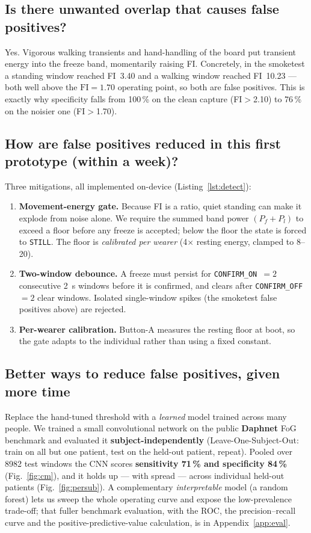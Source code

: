 \documentclass[11pt,a4paper]{article}
\begin{document}
\subsection{Is there unwanted overlap that causes false positives?}
Yes. Vigorous walking transients and hand-handling of the board put transient energy
into the freeze band, momentarily raising FI. Concretely, in the smoketest a standing
window reached FI~3.40 and a walking window reached FI~10.23 --- both well above the
$\mathrm{FI}=1.70$ operating point, so both are false positives. This is exactly why
specificity falls from 100\,\% on the clean capture (FI$>$2.10) to 76\,\% on the
noisier one (FI$>$1.70).

\subsection{How are false positives reduced in this first prototype (within a week)?}
Three mitigations, all implemented on-device (Listing~\ref{lst:detect}):
\begin{enumerate}[leftmargin=1.6em]
\item \textbf{Movement-energy gate.} Because FI is a ratio, quiet standing can make it
      explode from noise alone. We require the summed band power
      $(P_f+P_l)$ to exceed a floor before any freeze is accepted; below the floor the
      state is forced to \texttt{STILL}. The floor is \emph{calibrated per wearer}
      (4$\times$ resting energy, clamped to \numrange{8}{20}).
\item \textbf{Two-window debounce.} A freeze must persist for
      \texttt{CONFIRM\_ON}~$=2$ consecutive \SI{2}{\second} windows before it is
      confirmed, and clears after \texttt{CONFIRM\_OFF}~$=2$ clear windows. Isolated
      single-window spikes (the smoketest false positives above) are rejected.
\item \textbf{Per-wearer calibration.} Button-A measures the resting floor at boot, so
      the gate adapts to the individual rather than using a fixed constant.
\end{enumerate}

\subsection{Better ways to reduce false positives, given more time}
Replace the hand-tuned threshold with a \emph{learned} model trained across many
people. We trained a small convolutional network on the public \textbf{Daphnet} FoG
benchmark and evaluated it \textbf{subject-independently} (Leave-One-Subject-Out:
train on all but one patient, test on the held-out patient, repeat). Pooled over
\num{8982} test windows the CNN scores \textbf{sensitivity 71\,\% and specificity
84\,\%} (Fig.~\ref{fig:cm}), and it holds up --- with spread --- across individual
held-out patients (Fig.~\ref{fig:persub}). A complementary \emph{interpretable} model
(a random forest) lets us sweep the whole operating curve and expose the
low-prevalence trade-off; that fuller benchmark evaluation, with the ROC, the
precision--recall curve and the positive-predictive-value calculation, is in
Appendix~\ref{app:eval}.
\end{document}
